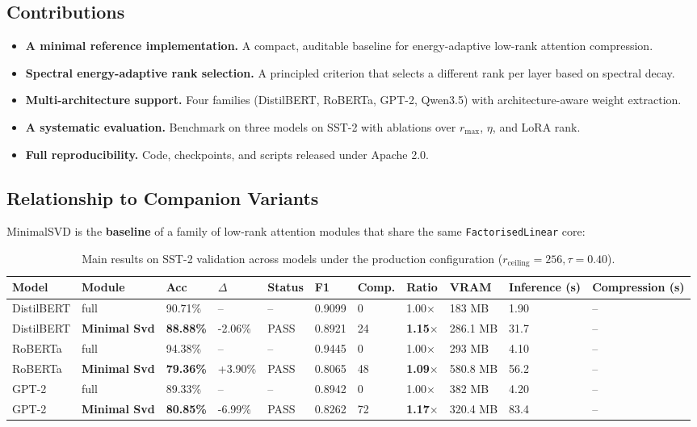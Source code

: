 \subsection{Contributions}

\begin{itemize}
\item \textbf{A minimal reference implementation.} A compact, auditable baseline for
  energy-adaptive low-rank attention compression.
\item \textbf{Spectral energy-adaptive rank selection.} A principled criterion that
  selects a different rank per layer based on spectral decay.
\item \textbf{Multi-architecture support.} Four families (DistilBERT, RoBERTa, GPT-2,
  Qwen3.5) with architecture-aware weight extraction.
\item \textbf{A systematic evaluation.} Benchmark on three models on SST-2 with
  ablations over $r_\text{max}$, $\eta$, and LoRA rank.
\item \textbf{Full reproducibility.} Code, checkpoints, and scripts released under
  Apache 2.0.

\end{itemize}
\subsection{Relationship to Companion Variants}

MinimalSVD is the \textbf{baseline} of a family of low-rank attention modules 
that share the same \texttt{FactorisedLinear} core:

\begin{table}[t]
\centering
\small
\begin{tabular}{lllllllllll}
\toprule
\textbf{Model} & \textbf{Module} & \textbf{Acc} & \textbf{$\Delta$} & \textbf{Status} & \textbf{F1} & \textbf{Comp.} & \textbf{Ratio} & \textbf{VRAM} & \textbf{Inference (s)} & \textbf{Compression (s)} \\
\midrule
DistilBERT & full & 90.71\% & -- & -- & 0.9099 & 0 & 1.00$\times$ & 183 MB & 1.90 & -- \\
DistilBERT & \textbf{Minimal Svd} & \textbf{88.88\%} & -2.06\% & PASS & 0.8921 & 24 & \textbf{1.15$\times$} & 286.1 MB & 31.7 & -- \\
RoBERTa & full & 94.38\% & -- & -- & 0.9445 & 0 & 1.00$\times$ & 293 MB & 4.10 & -- \\
RoBERTa & \textbf{Minimal Svd} & \textbf{79.36\%} & +3.90\% & PASS & 0.8065 & 48 & \textbf{1.09$\times$} & 580.8 MB & 56.2 & -- \\
GPT-2 & full & 89.33\% & -- & -- & 0.8942 & 0 & 1.00$\times$ & 382 MB & 4.20 & -- \\
GPT-2 & \textbf{Minimal Svd} & \textbf{80.85\%} & -6.99\% & PASS & 0.8262 & 72 & \textbf{1.17$\times$} & 320.4 MB & 83.4 & -- \\
\bottomrule
\end{tabular}
\caption{Main results on SST-2 validation across models under the production configuration ($r_{\mathrm{ceiling}}=256, \tau=0.40$).}
\label{tab:main_sst2}
\end{table}


